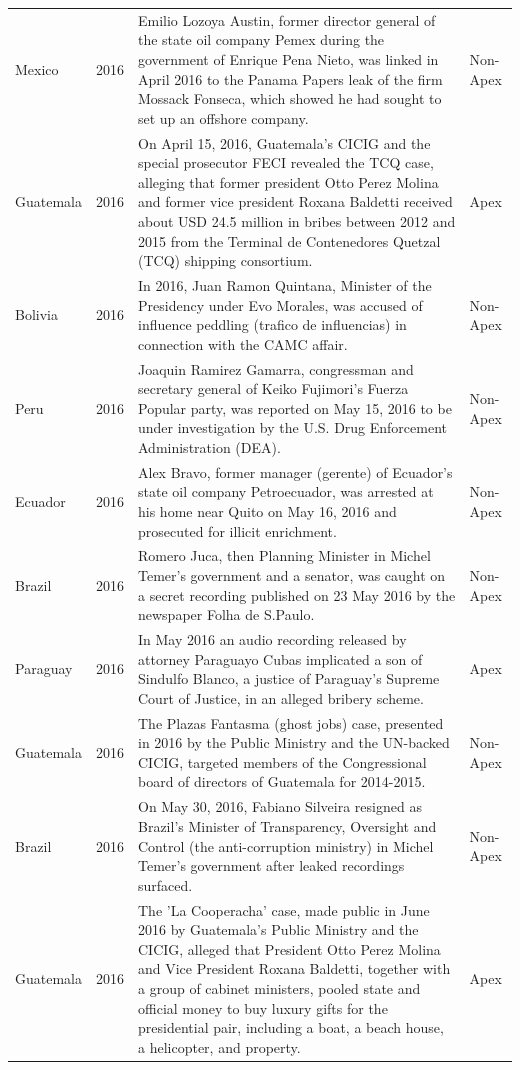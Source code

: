 \begin{landscape}
\begin{longtable}{@{}l c p{15.5cm} l@{}}
Mexico & 2016 & Emilio Lozoya Austin, former director general of the state oil company Pemex during the government of Enrique Pena Nieto, was linked in April 2016 to the Panama Papers leak of the firm Mossack Fonseca, which showed he had sought to set up an offshore company. & Non-Apex \\
Guatemala & 2016 & On April 15, 2016, Guatemala's CICIG and the special prosecutor FECI revealed the TCQ case, alleging that former president Otto Perez Molina and former vice president Roxana Baldetti received about USD 24.5 million in bribes between 2012 and 2015 from the Terminal de Contenedores Quetzal (TCQ) shipping consortium. & Apex \\
Bolivia & 2016 & In 2016, Juan Ramon Quintana, Minister of the Presidency under Evo Morales, was accused of influence peddling (trafico de influencias) in connection with the CAMC affair. & Non-Apex \\
Peru & 2016 & Joaquin Ramirez Gamarra, congressman and secretary general of Keiko Fujimori's Fuerza Popular party, was reported on May 15, 2016 to be under investigation by the U.S. Drug Enforcement Administration (DEA). & Non-Apex \\
Ecuador & 2016 & Alex Bravo, former manager (gerente) of Ecuador's state oil company Petroecuador, was arrested at his home near Quito on May 16, 2016 and prosecuted for illicit enrichment. & Non-Apex \\
Brazil & 2016 & Romero Juca, then Planning Minister in Michel Temer's government and a senator, was caught on a secret recording published on 23 May 2016 by the newspaper Folha de S.Paulo. & Non-Apex \\
Paraguay & 2016 & In May 2016 an audio recording released by attorney Paraguayo Cubas implicated a son of Sindulfo Blanco, a justice of Paraguay's Supreme Court of Justice, in an alleged bribery scheme. & Apex \\
Guatemala & 2016 & The Plazas Fantasma (ghost jobs) case, presented in 2016 by the Public Ministry and the UN-backed CICIG, targeted members of the Congressional board of directors of Guatemala for 2014-2015. & Non-Apex \\
Brazil & 2016 & On May 30, 2016, Fabiano Silveira resigned as Brazil's Minister of Transparency, Oversight and Control (the anti-corruption ministry) in Michel Temer's government after leaked recordings surfaced. & Non-Apex \\
Guatemala & 2016 & The 'La Cooperacha' case, made public in June 2016 by Guatemala's Public Ministry and the CICIG, alleged that President Otto Perez Molina and Vice President Roxana Baldetti, together with a group of cabinet ministers, pooled state and official money to buy luxury gifts for the presidential pair, including a boat, a beach house, a helicopter, and property. & Apex \\

\end{longtable}
\end{landscape}
